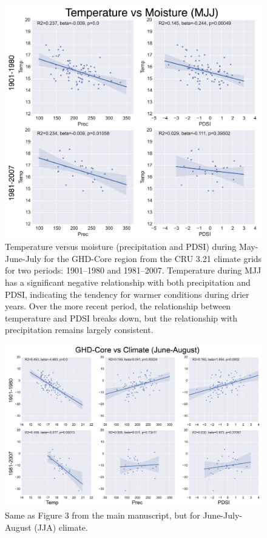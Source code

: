 \documentclass[12pt]{article}
\begin{document}
\begin{figure}
\center
\includegraphics[width=1.0\columnwidth,scale=2]{SUPP_fig_12_temp_vs_moist_MJJ.png}
\caption{Temperature versus moisture (precipitation and PDSI) during May-June-July for the GHD-Core region from the CRU 3.21 climate grids for two periods: 1901--1980 and 1981--2007. Temperature during MJJ has a significant negative relationship with both precipitation and PDSI, indicating the tendency for warmer conditions during drier years. Over the more recent period, the relationship between temperature and PDSI breaks down, but the relationship with precipitation remains largely consistent.}
\end{figure}

\begin{figure}
\center
\includegraphics[width=1.0\columnwidth,scale=2]{SUPP_fig_13_JJA_clim_regplots.png}
\caption{Same as Figure 3 from the main manuscript, but for June-July-August (JJA) climate.}
\end{figure}
\end{document}
